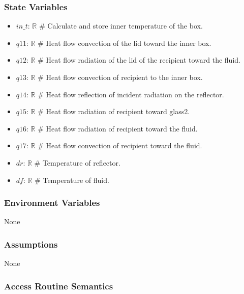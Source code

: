 \documentclass[12pt, titlepage]{article}
\begin{document}
\subsubsection{State Variables}
\begin{itemize}
    \item $in\_t$: $\mathbb{R}$   \# Calculate and store inner temperature of the box. 
    \item $q11$: $\mathbb{R}$ \# Heat flow convection of the lid toward the inner box. 
    \item $q12$: $ \mathbb{R}$ \# Heat flow radiation of the lid of the recipient toward the fluid.
    \item $q13$: $ \mathbb{R}$ \# Heat flow convection of recipient to the inner box.
    \item $q14$: $ \mathbb{R}$ \# Heat flow reflection of incident radiation on the reflector. 
    \item $q15$: $ \mathbb{R}$ \# Heat flow radiation of recipient toward glass2. 
    \item $q16$: $ \mathbb{R}$ \# Heat flow radiation of recipient toward the fluid. 
    \item $q17$: $ \mathbb{R}$ \# Heat flow convection of recipient toward the fluid. 
    \item $dr$: $ \mathbb{R}$ \# Temperature of reflector. 
    \item $df$: $ \mathbb{R}$ \# Temperature of fluid. 
\end{itemize}


 

\subsubsection{Environment Variables}

None

\subsubsection{Assumptions}

None

\subsubsection{Access Routine Semantics}
\end{document}
